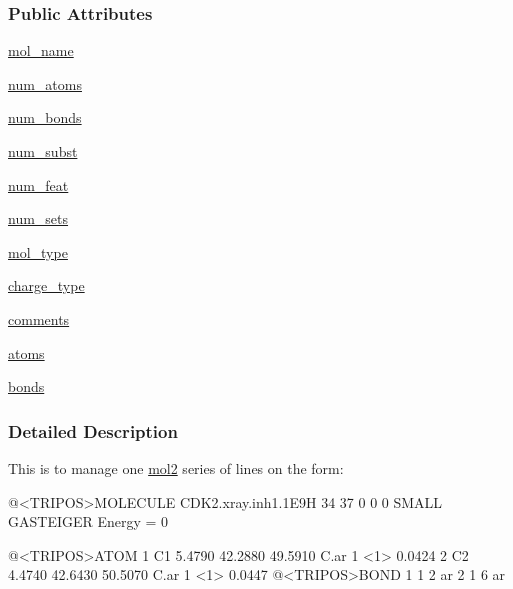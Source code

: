 \subsubsection*{Public Attributes}
\begin{DoxyCompactItemize}
\item 
\hyperlink{classforcebalance_1_1Mol2_1_1mol2_a5aedb128d92f2ce5a046b02a491fd57c}{mol\-\_\-name}
\item 
\hyperlink{classforcebalance_1_1Mol2_1_1mol2_adac16a5c3befa0526d590500efaf6fff}{num\-\_\-atoms}
\item 
\hyperlink{classforcebalance_1_1Mol2_1_1mol2_a78c4db3464070c1a9b2ab1c3a39ecd7c}{num\-\_\-bonds}
\item 
\hyperlink{classforcebalance_1_1Mol2_1_1mol2_ad4d5d6e9ac482b18da6dcfd13fa207fc}{num\-\_\-subst}
\item 
\hyperlink{classforcebalance_1_1Mol2_1_1mol2_a8bf43710df56fd7a99228373d6d948d4}{num\-\_\-feat}
\item 
\hyperlink{classforcebalance_1_1Mol2_1_1mol2_ac609df48177165a60d5277709c3e5476}{num\-\_\-sets}
\item 
\hyperlink{classforcebalance_1_1Mol2_1_1mol2_a6427ebba692b2b3e10badcc0a5ddc1f8}{mol\-\_\-type}
\item 
\hyperlink{classforcebalance_1_1Mol2_1_1mol2_a4713978f4f15b86ff073330daa60f3d4}{charge\-\_\-type}
\item 
\hyperlink{classforcebalance_1_1Mol2_1_1mol2_a17c69c3e6a4074d9349daa3af7f603e2}{comments}
\item 
\hyperlink{classforcebalance_1_1Mol2_1_1mol2_a0c0f2e9e963175713692b51bdc7f08e9}{atoms}
\item 
\hyperlink{classforcebalance_1_1Mol2_1_1mol2_af5d55171d13ee99d083adeffb359b19f}{bonds}
\end{DoxyCompactItemize}


\subsubsection{Detailed Description}
This is to manage one \hyperlink{classforcebalance_1_1Mol2_1_1mol2}{mol2} series of lines on the form\-: 

\begin{DoxyVerb} @<TRIPOS>MOLECULE
 CDK2.xray.inh1.1E9H
  34 37 0 0 0
 SMALL
 GASTEIGER
 Energy = 0
 
 @<TRIPOS>ATOM
       1 C1          5.4790   42.2880   49.5910 C.ar    1  <1>         0.0424
       2 C2          4.4740   42.6430   50.5070 C.ar    1  <1>         0.0447
 @<TRIPOS>BOND
      1     1     2   ar
      2     1     6   ar\end{DoxyVerb}
 

